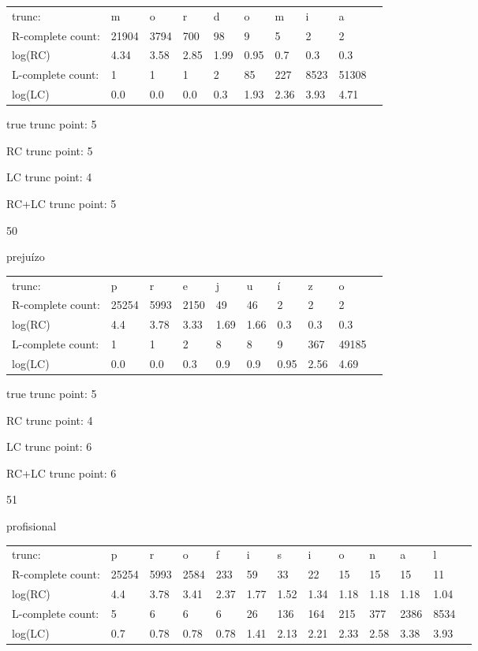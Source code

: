\documentclass{article}
\begin{document}
\begin{tabular}{l|lllllllll}
trunc: & m & o & r & d & o & m & i & a & \\ 
R-complete count: & 21904 & 3794 & 700 & 98 & 9 & 5 & 2 & 2 & \\ 
log(RC) & 4.34 & 3.58 & 2.85 & 1.99 & 0.95 & 0.7 & 0.3 & 0.3 & \\ 
L-complete count: & 1 & 1 & 1 & 2 & 85 & 227 & 8523 & 51308 & \\ 
log(LC) & 0.0 & 0.0 & 0.0 & 0.3 & 1.93 & 2.36 & 3.93 & 4.71 & \\ 
\end{tabular}

true trunc point: 5

RC trunc point: 5

LC trunc point: 4

RC+LC trunc point: 5

\vspace{1em}

50

prejuízo

\begin{tabular}{l|lllllllll}
trunc: & p & r & e & j & u & í & z & o & \\ 
R-complete count: & 25254 & 5993 & 2150 & 49 & 46 & 2 & 2 & 2 & \\ 
log(RC) & 4.4 & 3.78 & 3.33 & 1.69 & 1.66 & 0.3 & 0.3 & 0.3 & \\ 
L-complete count: & 1 & 1 & 2 & 8 & 8 & 9 & 367 & 49185 & \\ 
log(LC) & 0.0 & 0.0 & 0.3 & 0.9 & 0.9 & 0.95 & 2.56 & 4.69 & \\ 
\end{tabular}

true trunc point: 5

RC trunc point: 4

LC trunc point: 6

RC+LC trunc point: 6

\vspace{1em}

51

profisional

\begin{tabular}{l|llllllllllll}
trunc: & p & r & o & f & i & s & i & o & n & a & l & \\ 
R-complete count: & 25254 & 5993 & 2584 & 233 & 59 & 33 & 22 & 15 & 15 & 15 & 11 & \\ 
log(RC) & 4.4 & 3.78 & 3.41 & 2.37 & 1.77 & 1.52 & 1.34 & 1.18 & 1.18 & 1.18 & 1.04 & \\ 
L-complete count: & 5 & 6 & 6 & 6 & 26 & 136 & 164 & 215 & 377 & 2386 & 8534 & \\ 
log(LC) & 0.7 & 0.78 & 0.78 & 0.78 & 1.41 & 2.13 & 2.21 & 2.33 & 2.58 & 3.38 & 3.93 & \\ 
\end{tabular}
\end{document}
